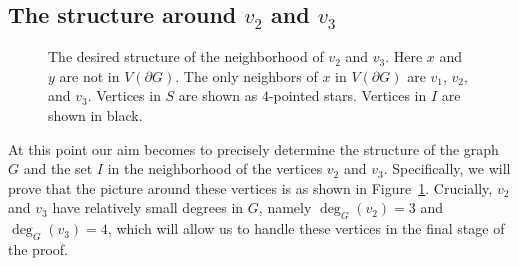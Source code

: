 \documentclass[11pt]{article}
\theoremstyle{slantthm}
\newtheorem{case}{Case}%
\numberwithin{equation}{section}
\theoremstyle{definition}
\newcommand\lav[1]{\textcolor{lav}{#1}}
\renewcommand{\geq}{\geqslant}
\numberwithin{equation}{section}
\newcommand{\0}{\varnothing}
\newcommand{\delsave}{\mathsf{DelSave}}
\newcommand{\bdry}[1]{{\partial #1}}
\newcommand\eugene[1]{{\color{xkcd_fern}{#1}}}
\begin{document}

\subsection{The structure around $v_2$ and $v_3$}

\begin{figure}[t]
        \centering
       
       \caption{The desired structure of the neighborhood of $v_2$ and $v_3$. Here $x$ and $y$ are not in $V(\bdry{G})$. The only neighbors of $x$ in $V(\bdry{G})$ are $v_1$, $v_2$, and $v_3$. Vertices in $S$ are shown as $4$-pointed stars. Vertices in $I$ are shown in black. %
       }\label{fig:xy}
\end{figure}

    At this point our aim becomes to precisely determine the structure of the graph $G$ and the set $I$ in the neighborhood of the vertices $v_2$ and $v_3$. Specifically, we will prove that the picture around these vertices is as shown in Figure~\ref{fig:xy}. Crucially, $v_2$ and $v_3$ have relatively small degrees in $G$, namely $\deg_G(v_2) = 3$ and $\deg_G(v_3) = 4$, which will allow us to handle these vertices in the final stage of the proof. 
    
\end{document}
